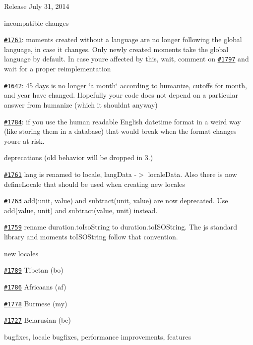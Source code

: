 \begin{DoxyItemize}
\item Release July 31, 2014
\item incompatible changes
\begin{DoxyItemize}
\item \href{https://github.com/moment/moment/issues/1761}{\tt \#1761}\+: moments created without a language are no longer following the global language, in case it changes. Only newly created moments take the global language by default. In case you\textquotesingle{}re affected by this, wait, comment on \href{https://github.com/moment/moment/issues/1797}{\tt \#1797} and wait for a proper reimplementation
\item \href{https://github.com/moment/moment/issues/1642}{\tt \#1642}\+: 45 days is no longer \char`\"{}a month\char`\"{} according to humanize, cutoffs for month, and year have changed. Hopefully your code does not depend on a particular answer from humanize (which it shouldn\textquotesingle{}t anyway)
\item \href{https://github.com/moment/moment/issues/1784}{\tt \#1784}\+: if you use the human readable English datetime format in a weird way (like storing them in a database) that would break when the format changes you\textquotesingle{}re at risk.
\end{DoxyItemize}
\item deprecations (old behavior will be dropped in 3.)
\begin{DoxyItemize}
\item \href{https://github.com/moment/moment/issues/1761}{\tt \#1761} {\ttfamily lang} is renamed to {\ttfamily locale}, {\ttfamily lang\+Data} -\/$>$ {\ttfamily locale\+Data}. Also there is now {\ttfamily define\+Locale} that should be used when creating new locales
\item \href{https://github.com/moment/moment/issues/1763}{\tt \#1763} {\ttfamily add(unit, value)} and {\ttfamily subtract(unit, value)} are now deprecated. Use {\ttfamily add(value, unit)} and {\ttfamily subtract(value, unit)} instead.
\item \href{https://github.com/moment/moment/issues/1759}{\tt \#1759} rename {\ttfamily duration.\+to\+Iso\+String} to {\ttfamily duration.\+to\+I\+S\+O\+String}. The js standard library and moment\textquotesingle{}s {\ttfamily to\+I\+S\+O\+String} follow that convention.
\end{DoxyItemize}
\item new locales
\begin{DoxyItemize}
\item \href{https://github.com/moment/moment/issues/1789}{\tt \#1789} Tibetan (bo)
\item \href{https://github.com/moment/moment/issues/1786}{\tt \#1786} Africaans (af)
\item \href{https://github.com/moment/moment/issues/1778}{\tt \#1778} Burmese (my)
\item \href{https://github.com/moment/moment/issues/1727}{\tt \#1727} Belarusian (be)
\end{DoxyItemize}
\item bugfixes, locale bugfixes, performance improvements, features
\end{DoxyItemize}


